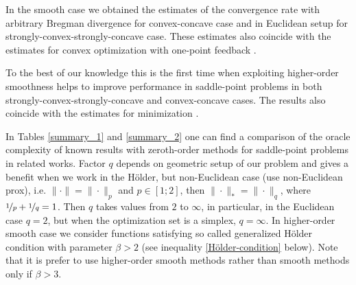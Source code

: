 \documentclass[runningheads]{llncs}
\begin{document}
In the smooth case we obtained the estimates of the convergence rate with arbitrary Bregman divergence for convex-concave case and in Euclidean setup for strongly-convex-strongly-concave case. These estimates also coincide with the estimates for convex optimization with one-point feedback \cite{gasnikov2017stochastic}. 

To the best of our knowledge this is the first time when exploiting higher-order smoothness helps to improve performance in saddle-point problems in both  strongly-convex-strongly-concave and convex-concave cases. The results also coincide with the estimates for minimization \cite{novitskii2021improved,akhavan2020exploiting}. 

In Tables \ref{summary_1} and \ref{summary_2} one can find a comparison of the oracle complexity of known results with zeroth-order methods for saddle-point problems in related works. Factor $q$ depends on geometric setup of our problem and gives a benefit when we work in the Hölder, but non-Euclidean case (use non-Euclidean prox), i.e. $\| \cdot\| = \|\cdot\|_p$ and $p \in [1;2]$, then $\| \cdot \|_* = \| \cdot\|_q$, where $\nicefrac{1}{p} +\nicefrac{1}{q} = 1$. Then $q$ takes values from $2$ to $\infty$, in particular, in the Euclidean case $q=2$, but when the optimization set is a simplex, $q = \infty$. 
In higher-order smooth case we consider functions satisfying so called generalized Hölder condition with parameter $\beta > 2$ (see inequality \eqref{Hölder-condition} below). Note that it is prefer to use higher-order smooth methods rather than smooth methods only if $\beta > 3$.
\renewcommand{\arraystretch}{1.5}
\renewcommand{\tabcolsep}{5pt} 
\end{document}
